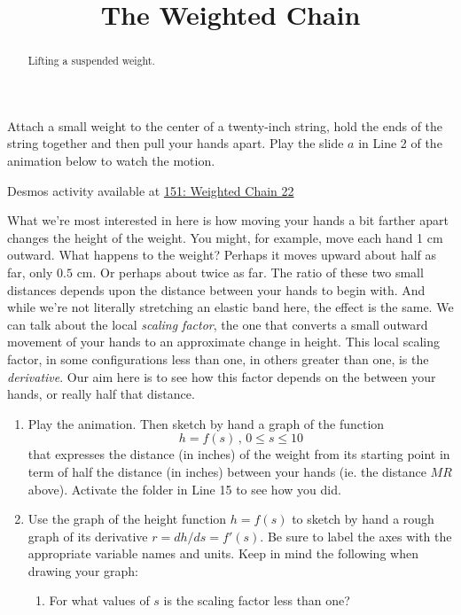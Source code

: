 \documentclass{ximera}
\title{The Weighted Chain}
\begin{document}
\begin{abstract}
Lifting a suspended weight.
\end{abstract}
\maketitle


\begin{question}  \label{Q:LMMN89}
Attach a small weight to the center of a twenty-inch string, hold the ends of the string together and then pull your hands apart. Play the slide $a$ in Line 2 of the animation below to watch the motion. 
\begin{onlineOnly}
    \begin{center}
\end{center}
\end{onlineOnly}

Desmos activity available at \href{https://www.desmos.com/calculator/jmqscra2if}{151: Weighted Chain 22} 

What we're most interested in here is how moving your hands a bit farther apart changes the height of the weight. You might, for example, move each hand 1 cm outward. What happens to the weight? Perhaps it moves upward about half as far, only $0.5$ cm. Or perhaps about twice as far. The ratio of these two small distances depends upon the distance between your hands to begin with. And while we're not literally stretching an elastic band here, the effect is the same. We can talk about the local \emph{scaling factor}, the one that converts a small outward movement of your hands to an approximate change in height. This local scaling factor, in some configurations less than one, in others greater than one, is the \emph{derivative}. Our aim here is to see how this factor depends on the between your hands, or really half that distance.


\begin{enumerate}
\item Play the animation. Then sketch by hand a graph of the function
\[
 h = f(s) \, , \, 0\leq s \leq 10
\]
that expresses the distance (in inches) of the weight from its starting point in term of half the distance (in inches) between your hands (ie. the distance $MR$ above). Activate the folder in Line 15 to see how you did.

\item Use the graph of the height function $h=f(s)$ to sketch by hand a rough graph of its derivative $r = dh/ds = f'(s)$. Be sure to label the axes with the appropriate variable names and units. Keep in mind the following when drawing your graph:
\begin{enumerate}
\item For what values of $s$ is the scaling factor less than one?


\end{enumerate}
\end{enumerate}
\end{question}
\end{document}
